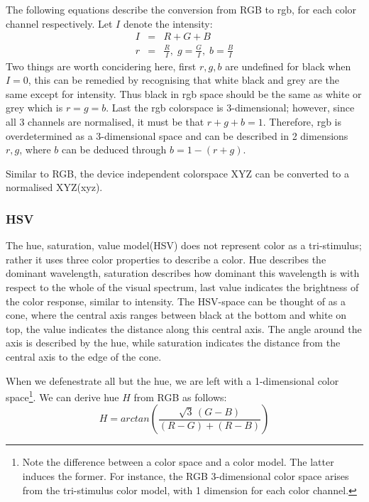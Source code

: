 \documentclass[a4paper,11pt]{article}
\begin{document}
The following equations describe the conversion from RGB to rgb, for each color channel respectively.  Let $I$ denote the intensity:
\begin{eqnarray}
\label{eq:rgb}
I &=& R+G+B \\
r &=& \frac{R}{I},\; g = \frac{G}{I},\; b = \frac{B}{I}
\end{eqnarray}
Two things are worth concidering here, first $r,g,b$ are undefined for black when $I=0$, this can be remedied by recognising that white black and grey are the same except for intensity. Thus black in rgb space should be the same as white or grey which is $r=g=b$. Last the rgb colorspace is 3-dimensional; however, since all 3 channels are normalised, it must be that $r+g+b=1$. Therefore, rgb is overdetermined as a 3-dimensional space and can be described in 2 dimensions $r,g$, where $b$ can be deduced through $b=1-(r+g)$.

Similar to RGB, the device independent colorspace XYZ can be converted to a normalised XYZ(xyz).		

\subsubsection{HSV}

The hue, saturation, value model(HSV) does not represent color as a tri-stimulus; rather it uses three color properties to describe a color. Hue describes the dominant wavelength, saturation describes how dominant this wavelength is with respect to the whole of the visual spectrum, last value indicates the brightness of the color response, similar to intensity. The HSV-space can be thought of as a cone, where the central axis ranges between black at the bottom and white on top, the value indicates the distance along this central axis. The angle around the axis is described by the hue, while saturation indicates the distance from the central axis to the edge of the cone. 

When we defenestrate all but the hue, we are left with a 1-dimensional color space\footnote{Note the difference between a color space and a color model. The latter induces the former. For instance, the RGB 3-dimensional color space arises from the tri-stimulus color model, with 1 dimension for each color channel.}.  We can derive hue $H$ from RGB as follows:
\begin{equation}
\label{eq:hue}
H = arctan\left(\frac{\sqrt{3}\,(G-B)}{(R-G)+(R-B)}\right)
\end{equation} 
\end{document}
